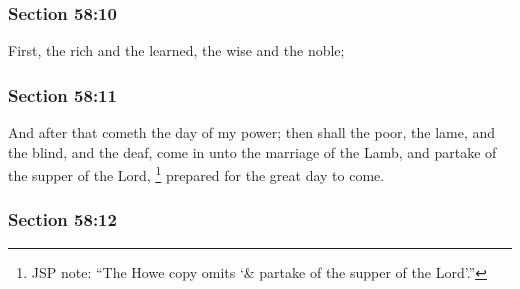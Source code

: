 
	\subsubsection{Section 58:10} %
		\label{DC58-10}

		First, the rich and the learned, the wise and the noble;


	\subsubsection{Section 58:11} %
		\label{DC58-11}

		And after that cometh the day of my power; then shall the poor, the lame, and the blind, and the deaf, come in unto the marriage of the Lamb, and partake of the supper of the Lord,%
			\footnote{%
				JSP note: ``The Howe copy omits `\& partake of the supper of the Lord'.''
				}
		prepared for the great day to come.


	\subsubsection{Section 58:12} %
		\label{DC58-12}

